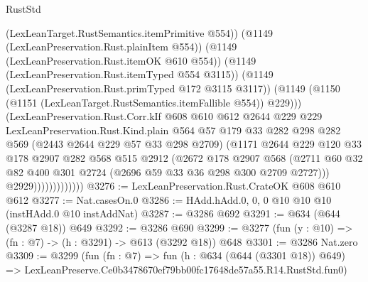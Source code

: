 \begin{lexlean}{RustStd}
\begin{coremodule}
                              (LexLeanTarget.RustSemantics.itemPrimitive @554))
                            (@1149 (LexLeanPreservation.Rust.plainItem @554))
                            (@1149 (LexLeanPreservation.Rust.itemOK @610 @554))
                            (@1149 (LexLeanPreservation.Rust.itemTyped @554 @3115))
                            (@1149 (LexLeanPreservation.Rust.primTyped @172 @3115 @3117))
                            (@1149
                              (@1150 (@1151 (LexLeanTarget.RustSemantics.itemFallible @554)) @229)))
                          (LexLeanPreservation.Rust.Corr.kIf
                            @608
                            @610
                            @612
                            @2644
                            @229
                            @229
                            LexLeanPreservation.Rust.Kind.plain
                            @564
                            @57
                            @179
                            @33
                            @282
                            @298
                            @282
                            @569
                            (@2443 @2644 @229 @57 @33 @298 @2709)
                            (@1171
                              @2644
                              @229
                              @120
                              @33
                              @178
                              @2907
                              @282
                              @568
                              @515
                              @2912
                              (@2672
                                @178
                                @2907
                                @568
                                (@2711
                                  @60
                                  @32
                                  @82
                                  @400
                                  @301
                                  @2724
                                  (@2696 @59 @33 @36 @298 @300 @2709 @2727)))
                              @2929)))))))))))))
@3276 := LexLeanPreservation.Rust.CrateOK @608 @610 @612
@3277 := Nat.casesOn.{0}
@3286 := HAdd.hAdd.{0, 0, 0} @10 @10 @10 (instHAdd.{0} @10 instAddNat)
@3287 := @3286 @692
@3291 := @634 (@644 (@3287 @18)) @649
@3292 := @3286 @690
@3299 := @3277 (fun (y : @10) => (fn : @7) -> (h : @3291) -> @613 (@3292 @18)) @648
@3301 := @3286 Nat.zero
@3309 := @3299
    (fun (fn : @7) =>
    fun (h : @634 (@644 (@3301 @18)) @649) =>
    LexLeanPreserve.Ce0b3478670ef79bb00fc17648de57a55.R14.RustStd.fun0)

\end{coremodule}
\end{lexlean}
